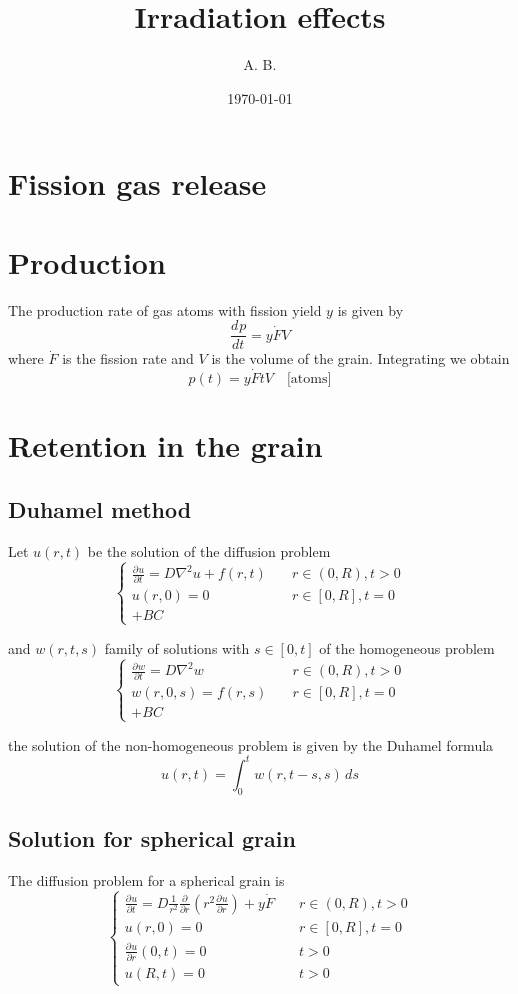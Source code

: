 \documentclass{article}
\title{Irradiation effects}
\author{A. B.}
\date{\today}
\newcommand{\deriv}[3][]{\frac{d^{#1} #2}{d #3^{#1}}}
\newcommand{\pderiv}[3][]{\frac{\partial^{#1} #2}{\partial #3^{#1}}}
\begin{document}
\maketitle

\section{Fission gas release}

\section{Production}
The production rate of gas atoms with fission yield $y$ is given by
\[
  \deriv{p}{t} = y\dot{F}V
\]
where $\dot{F}$ is the fission rate and $V$ is the volume of the grain. Integrating we obtain
\[
  p(t) = y\dot{F}tV \quad \text{[atoms]}
\]

\section{Retention in the grain}

\subsection{Duhamel method}
Let $u(r,t)$ be the solution of the diffusion problem
$$\[
  \begin{cases}
    \pderiv{u}{t} = D \nabla^2 u + f(r,t)  \quad & r \in (0, R), t > 0 \\
    u(r,0) = 0 \quad & r \in [0, R], t = 0 \\
    + BC
  \end{cases}
\]

and \(w(r,t,s)\) family of solutions with \(s \in [0,t]\) of the homogeneous problem
\[
  \begin{cases}
    \pderiv{w}{t} = D \nabla^2 w  \quad & r \in (0, R), t > 0 \\
    w(r,0,s) = f(r,s) \quad & r \in [0, R], t = 0 \\
    + BC
  \end{cases} 
\]

the solution of the non-homogeneous problem is given by the Duhamel formula
\[
  u(r,t) = \int_0^t w(r,t-s,s) \, ds
\]
\subsection{Solution for spherical grain}
The diffusion problem for a spherical grain is
\[
\begin{cases}
  \pderiv{u}{t} = D \frac{1}{r^2}\pderiv{}{r}( r^2 \pderiv{u}{r} ) + y\dot{F}  \quad & r \in (0, R), t > 0 \\
  u(r,0) = 0 \quad & r \in [0, R], t = 0 \\
  \pderiv{u}{r}(0,t) = 0 \quad & t > 0\\
  u(R, t) = 0 \quad & t > 0
\end{cases}
\]
\end{document}
